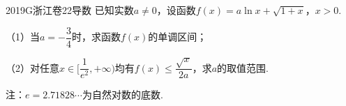 
\begin{problem}{2019}{G}{浙江卷}{22}{导数}
已知实数$a\neq0$，设函数$f(x)=a\ln x+\sqrt{1+x}$，$x>0$.

（1）当$a=-\dfrac{3}{4}$时，求函数$f(x)$的单调区间；

（2）对任意$x\in[\dfrac{1}{e^2},+\infty)$均有$f(x)\leq\dfrac{\sqrt{x}}{2a}$，求$a$的取值范围.

注：$e=2.71828\cdots$为自然对数的底数.
\end{problem}
